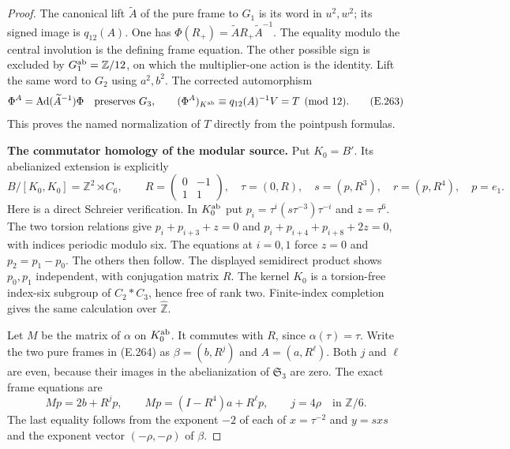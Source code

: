 \begin{proof}
The canonical lift $\widetilde A$ of the pure frame to
$G_1$ is its word in $u^2,w^2$; its signed image is
$q_{12}(A)$.  One has
$\Phi(R_+)=\widetilde A R_+\widetilde A^{-1}$.
The equality modulo the central involution is the
defining frame equation.  The other possible sign is
excluded by $G_1^{\rm ab}=\mathbb Z/12$, on which the
multiplier-one action is the identity.
Lift the same word to $G_2$ using $a^2,b^2$.
The corrected automorphism
\[
 \Phi^A=\operatorname{Ad}(\widetilde A^{-1})\Phi
 \quad\text{preserves }G_3,\qquad
 (\Phi^A)_{K^{\rm ab}}\equiv
          q_{12}(A)^{-1}V=T\pmod {12}.
                                                               \tag{E.263}
\]
This proves the named normalization of $T$ directly
from the pointpush formulas.

\par\medskip\noindent\textbf{The commutator homology of the modular source.}\quad
Put $K_0=B'$.  Its abelianized extension is explicitly
\[
 B/[K_0,K_0]=\mathbb Z^2\rtimes C_6,\qquad
 R=\begin{pmatrix}0&-1\\1&1\end{pmatrix},\quad
 \tau=(0,R),\quad s=(p,R^3),\quad r=(p,R^4),\quad p=e_1.
                                                               \tag{E.264}
\]
Here is a direct Schreier verification.  In $K_0^{\rm ab}$
put $p_i=\tau^i(s\tau^{-3})\tau^{-i}$ and
$z=\tau^6$.  The two torsion relations give
$p_i+p_{i+3}+z=0$ and
$p_i+p_{i+4}+p_{i+8}+2z=0$, with indices periodic
modulo six.  The equations at $i=0,1$ force $z=0$
and $p_2=p_1-p_0$.  The others then follow.
The displayed semidirect product shows $p_0,p_1$
independent, with conjugation matrix $R$.
The kernel $K_0$ is a torsion-free index-six subgroup
of $C_2*C_3$, hence free of rank two.  Finite-index
completion gives the same calculation over
$\widehat{\mathbb Z}$.

Let $M$ be the matrix of $\alpha$ on $K_0^{\rm ab}$.
It commutes with $R$, since $\alpha(\tau)=\tau$.
Write the two pure frames in (E.264) as
$\beta=(b,R^j)$ and $A=(a,R^\ell)$.
Both $j$ and $\ell$ are even, because their images
in the abelianization of $\mathfrak S_3$ are zero.
The exact frame equations are
\[
 Mp=2b+R^jp,
 \qquad Mp=(I-R^4)a+R^\ell p,
 \qquad j=4\rho\quad\text{in }\mathbb Z/6.
                                                               \tag{E.265}
\]
The last equality follows from the exponent $-2$ of
each of $x=\tau^{-2}$ and $y=sxs$ and the exponent
vector $(-\rho,-\rho)$ of $\beta$.


\end{proof}
